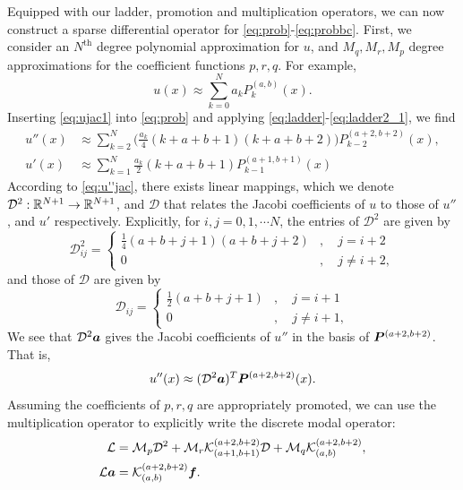 Equipped with our ladder, promotion and multiplication operators, we can now construct a sparse differential operator for \eqref{eq:prob}-\eqref{eq:probbc}. First, we consider an $N^{\text{th}}$  degree polynomial approximation for $u$, and $M_q,M_r,M_p$ degree approximations for the coefficient functions $p,r,q$. For example,
\begin{equation}\label{eq:ujac1}
u(x) \approx \sum_{k=0}^Na_kP_k^{(a,b)}(x).
\end{equation}
Inserting \eqref{eq:ujac1} into \eqref{eq:prob} and applying \eqref{eq:ladder}-\eqref{eq:ladder2_1}, we find
\begin{equation}\label{eq:u''jac}
\begin{split}
u''(x) &\approx \sum_{k=2}^N \Big(\frac{a_k}{4}(k+a+b+1)(k+a+b+2)\Big)P_{k-2}^{(a+2,b+2)}(x),\\
u'(x) &\approx \sum_{k=1}^N \frac{a_k}{2}(k+a+b+1)P_{k-1}^{(a+1,b+1)}(x)
\end{split}
\end{equation}
According to \eqref{eq:u''jac}, there exists linear mappings, which we denote $\mathcal{D}^2 : \mathbb{R}^{N+1}\to \mathbb{R}^{N+1}$, and $\mathcal{D}$ that relates the Jacobi coefficients of $u$ to those of $u''$, and $u'$ respectively. Explicitly, for $i,j = 0,1,\cdots N$, the entries of $\mathcal{D}^2$ are given by
\begin{equation}\label{eq:D2}
\mathcal{D}^2_{ij} = 
\begin{cases} \frac{1}{4}(a+b+j+1)(a+b+j+2)&,\quad j = i+2\\
0&, \quad j \neq i + 2,
\end{cases}
\end{equation}
and those of $\mathcal{D}$ are given by
\begin{equation}
\mathcal{D}_{ij} = 
\begin{cases} \frac{1}{2}(a+b+j+1)&,\quad j = i+1\\
	0&, \quad j \neq i + 1,
\end{cases}	
\end{equation}
We see that $\mathcal{D}^2 \boldsymbol{a}$ gives the Jacobi coefficients of $u''$ in the basis of $\boldsymbol{P}^{(a+2,b+2)}$. That is,
\begin{equation}
u''(x) \approx (\mathcal{D}^2 \boldsymbol{a})^T \boldsymbol{P}^{(a+2,b+2)}(x).
\end{equation}
Assuming the coefficients of $p,r,q$ are appropriately promoted, we can use the multiplication operator to explicitly write the discrete modal operator:
\begin{equation}
\begin{split}
\mathcal{L} &= 
\mathcal{M}_p\mathcal{D}^2 + \mathcal{M}_r\mathcal{K}_{(a+1,b+1)}^{(a+2,b+2)} \mathcal{D} + \mathcal{M}_q\mathcal{K}_{(a,b)}^{(a+2,b+2)},\\
\mathcal{L}\boldsymbol{a} &= \mathcal{K}_{(a,b)}^{(a+2,b+2)}\boldsymbol{f}.
\end{split}
\end{equation}

